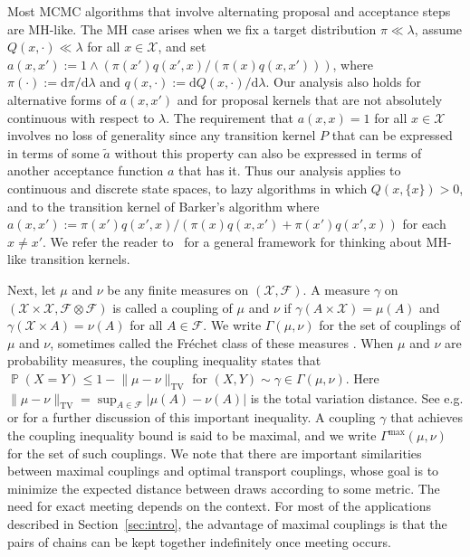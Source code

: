 \documentclass[aihp]{imsart}
\theoremstyle{plain}
\theoremstyle{remark}
\theoremstyle{definition} \newtheorem{example}{Example}
\renewcommand{\P}{\operatorname{\mathbb{P}}}
\newcommand{\scrF}{\mathscr{F}}
\newcommand{\calX}{\mathcal{X}}
\newcommand{\cd}{\cdot}
\newcommand{\TV}{\mathrm{TV}}
\newcommand{\diff}{\mathrm{d} } %
\newcommand{\calXp}{\calX \times \calX}
\newcommand{\scrFp}{\scrF \otimes \scrF}
\newcommand{\sx}{\{ x \}}
\newcommand{\Gmax}{\Gamma^\mathrm{max}}
\begin{document}
Most MCMC algorithms that involve alternating proposal and acceptance steps are MH-like. The MH case
arises when we fix a target distribution $\pi \ll \lambda$, assume $Q(x, \cdot) \ll \lambda$ for all
$x \in \calX$, and set ${ a(x,x') := 1 \wedge ( \pi(x') q(x',x) / (\pi(x) q(x,x') ) ) }$, where
$\pi( \cd ) := \diff \pi / \diff \lambda$ and $q(x, \cd) := \diff Q(x,\cd) / \diff \lambda$. Our
analysis also holds for alternative forms of $a(x,x')$ and for proposal kernels that are not
absolutely continuous with respect to $\lambda$. The requirement that $a(x,x) = 1$ for all $x \in
\calX$ involves no loss of generality since any transition kernel $P$ that can be expressed in terms
of some $\tilde a$ without this property can also be expressed in terms of another acceptance
function $a$ that has it. Thus our analysis applies to continuous and discrete state spaces, to lazy
algorithms in which $Q(x, \sx) > 0$, and to the transition kernel of Barker's algorithm
\citep{Barker1965} where ${a(x,x') := \pi(x') q(x',x) / (\pi(x) q(x,x') + \pi(x') q(x',x))}$ for
each $x\neq x'$. We refer the reader to~\citet{andrieu2020general} for a general framework for
thinking about MH-like transition kernels.

Next, let $\mu$ and $\nu$ be any finite measures on $(\calX, \scrF)$. A measure $\gamma$ on
$(\calXp, \scrFp)$ is called a coupling of $\mu$ and $\nu$ if $\gamma(A \times \calX) = \mu(A)$ and
$\gamma(\calX \times A) = \nu(A)$ for all $A \in \scrF$. We write $\Gamma(\mu, \nu)$ for the set of
couplings of $\mu$ and $\nu$, sometimes called the Fr\'echet class of these measures
\citep{kendall2017lectures}. When $\mu$ and $\nu$ are probability measures, the coupling inequality
states that ${\P(X = Y) \leq 1 - \lVert \mu - \nu \rVert_\TV}$ for $(X,Y) \sim \gamma \in
\Gamma(\mu, \nu)$. Here $\lVert \mu - \nu \rVert_\TV = \sup_{A \in \scrF} | \mu(A) - \nu(A) |$ is
the total variation distance. See e.g. \citet[chap. 1.2]{lindvall2002lectures} or
\citet[chap.~4]{Levin2017} for a further discussion of this important inequality. A coupling
$\gamma$ that achieves the coupling inequality bound is said to be maximal, and we write $\Gmax(\mu,
\nu)$ for the set of such couplings. We note that there are important similarities between maximal
couplings and optimal transport couplings, whose goal is to minimize the expected distance between
draws according to some metric. The need for exact meeting depends on the context. For most of the
applications described in Section~\ref{sec:intro}, the advantage of maximal couplings is that the
pairs of chains can be kept together indefinitely once meeting occurs.
\end{document}
